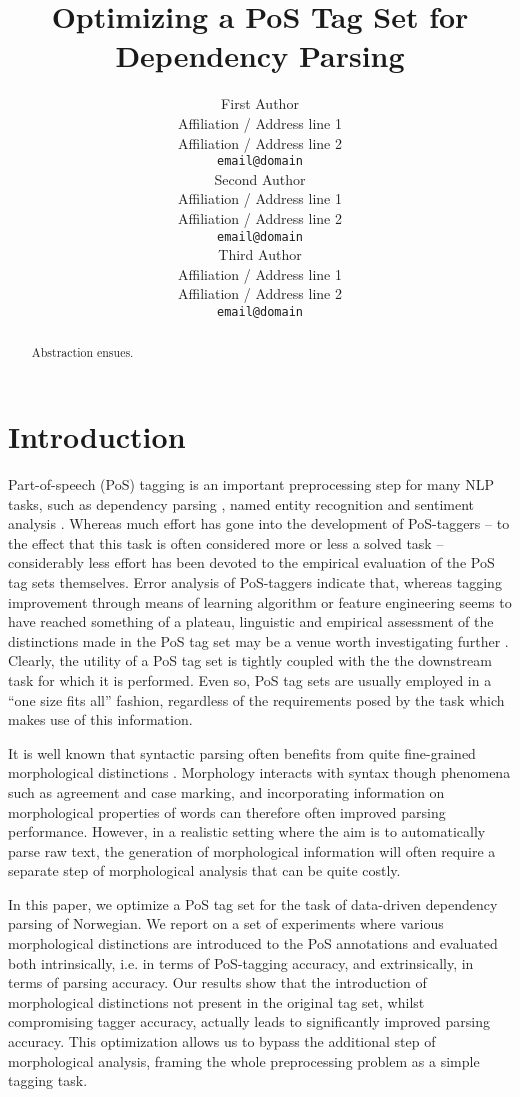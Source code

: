 \documentclass[11pt,a4paper]{article}
\title{Optimizing a PoS Tag Set for Dependency Parsing}
\author{First Author \\
  Affiliation / Address line 1 \\
  Affiliation / Address line 2 \\
  {\tt email@domain} \\\And
  Second Author \\
  Affiliation / Address line 1 \\
  Affiliation / Address line 2 \\
  {\tt email@domain}  \\\And
  Third Author \\
  Affiliation / Address line 1 \\
  Affiliation / Address line 2 \\
  {\tt email@domain} \\}
\date{}
\begin{document}
\maketitle
\begin{abstract}
Abstraction ensues.
\end{abstract}


\section{Introduction}
\label{sec:intro}
Part-of-speech (PoS) tagging is an important preprocessing step for many NLP tasks,
such as dependency parsing \cite{Niv:Hal:Kub:07,Haj:Cia:Joh:09}, named
entity recognition \cite{Tjo:DeM:03} and sentiment analysis
\cite{Wil:Wie:Hof:09}. Whereas much effort has gone into the
development of PoS-taggers -- to the effect that this task is often
considered more or less a solved task -- considerably less effort has
been devoted to the empirical evaluation of the PoS tag sets
themselves. Error analysis of PoS-taggers indicate that, whereas
tagging improvement through means of learning algorithm or feature
engineering seems to have reached something of a plateau, linguistic
and empirical assessment of the distinctions made in the PoS tag set may be a venue
worth investigating further \cite{Man:11}.  Clearly, the utility of a
PoS tag set is tightly coupled with the the downstream task for which
it is performed. Even so, PoS tag sets are usually employed in a ``one
size fits all'' fashion, regardless of the requirements posed by the
task which makes use of this information.

It is well known that syntactic parsing often benefits from quite
fine-grained morphological distinctions
\cite{Zha:Niv:11,See:Kuh:13}. Morphology interacts with syntax though
phenomena such as agreement and case marking, and incorporating
information on morphological properties of words can therefore often
improved parsing performance. However, in a realistic setting where
the aim is to automatically parse raw text, the generation of
morphological information will often require a separate step of
morphological analysis that can be quite costly.

In this paper, we optimize a PoS tag set for the task of
data-driven dependency parsing of Norwegian. We report on a set of experiments where various morphological
distinctions are introduced to the PoS annotations and evaluated both intrinsically, i.e. in
terms of PoS-tagging accuracy, and extrinsically, in terms of parsing
accuracy.  Our results show that the introduction of morphological
distinctions not present in the original tag set, whilst compromising
tagger accuracy, actually leads to significantly improved parsing
accuracy. This optimization allows us to bypass the additional step of
morphological analysis, framing the whole preprocessing problem as a
simple tagging task.
\end{document}
